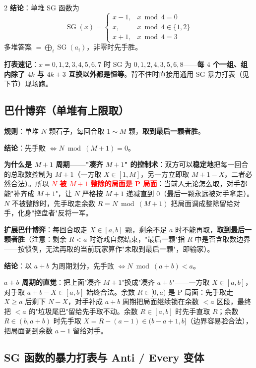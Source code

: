 \begin{multicols*}{2}
		\textbf{结论}：单堆 SG 函数为
		\[
			\operatorname{SG}(x) = \begin{cases}
									   x - 1, & x \bmod 4 = 0 \\
									   x,     & x \bmod 4 \in \{1, 2\} \\
									   x + 1, & x \bmod 4 = 3
			\end{cases}
		\]
		多堆答案 $= \bigoplus_i \operatorname{SG}(a_i)$，非零时先手胜。

		\textbf{打表速记}：$x = 0,1,2,3,4,5,6,7$ 时 SG 为 $0,1,2,4,3,5,6,8$——\textbf{每 $4$ 个一组、组内除了 $4k$ 与 $4k+3$ 互换以外都是恒等}。背不住时直接用通用 SG 暴力打表（见下节）现场跑。

		\subsection{巴什博弈（单堆有上限取）}

		\textbf{规则}：单堆 $N$ 颗石子，每回合取 $1 \sim M$ 颗，\textbf{取到最后一颗者胜}。

		\textbf{结论}：先手败 $\iff N \bmod (M+1) = 0$。

		\textbf{为什么是 $M+1$ 周期——"凑齐 $M+1$" 的控制术}：双方可以\textbf{稳定地}把每一回合的总取数控制为 $M+1$（一方取 $X \in [1, M]$，另一方立即取 $M+1-X$，二者必然合法）。所以 \textcolor{red}{\textbf{$N$ 被 $M+1$ 整除的局面是 P 局面}}：当前人无论怎么取，对手都能"补齐成 $M+1$"，让 $N$ 严格按 $M+1$ 递减直到 $0$（最后一颗永远被对手拿走）。$N$ 不被整除时，先手取走余数 $R = N \bmod (M+1)$ 把局面调成整除留给对手，化身"控盘者"反将一军。

		\textbf{扩展巴什博弈}：每回合取走 $X \in [a, b]$ 颗，剩余不足 $a$ 时不能再取，\textbf{取到最后一颗者胜}（注意：剩余 $R < a$ 时游戏自然结束，"最后一颗"指 $R$ 中是否含取数边界——按惯例，无法再取的当前玩家算作"未取到最后一颗"，即输家）。

		\textbf{结论}：以 $a+b$ 为周期划分，先手败 $\iff N \bmod (a+b) < a$。

		\textbf{$a+b$ 周期的直觉}：把上面"凑齐 $M+1$"换成"凑齐 $a+b$"——一方取 $X \in [a, b]$，对手取 $a+b-X \in [a, b]$ 始终合法。余数 $R \in [0, a)$ 是 P 局面：先手取走 $X \ge a$ 后剩下 $N - X$，对手补成 $a+b$ 周期把局面继续锁在余数 $<a$ 区段，最终把 $<a$ 的"垃圾尾巴"留给先手取不动。余数 $R \in [a, b]$ 时先手直取 $R$；余数 $R \in (b, a+b)$ 时先手取 $X = R - (a-1) \in (b-a+1, b]$（边界容易验合法），把局面调到余数 $a-1$ 留给对手。

		\subsection{SG 函数的暴力打表与 Anti / Every 变体}


\end{multicols*}
